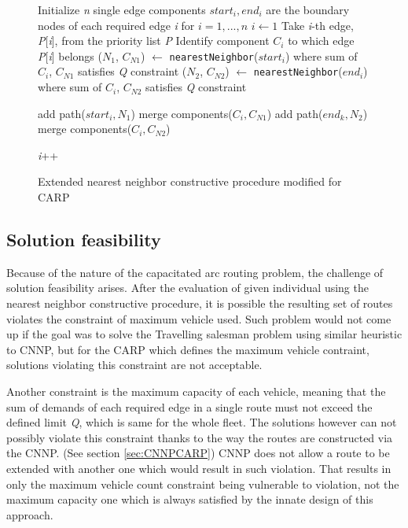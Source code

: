 \documentclass[twoside]{ctuthesis}
\theoremstyle{plain}
\theoremstyle{definition}
\theoremstyle{note}
\begin{document}
	
\begin{figure}
\begin{algorithmic}[1]
	\State Initialize \emph{n} single edge components \emph{$ start_i, end_i $} are the boundary nodes of each required edge \emph{i} for \emph{$ i = 1, ..., n $}
	\State $i \gets 1$
	\State Take \emph{i}-th edge, \emph{P}[\emph{i}], from the priority list \emph{P}
	\State Identify component \emph{$ C_i $} to which edge \emph{P}[\emph{i}] belongs
	\State (\emph{$N_1$}, \emph{$C_{N1}$}) $\gets$  {\tt nearestNeighbor}(\emph{$ start_i $}) where sum of \emph{$ C_i $}, \emph{$C_{N1}$} satisfies \emph{Q} constraint
	\State (\emph{$N_2$}, \emph{$C_{N2}$}) $\gets$  {\tt nearestNeighbor}(\emph{$ end_i $}) where sum of \emph{$ C_i $}, \emph{$C_{N2}$} satisfies \emph{Q} constraint
	
		\State add path(\emph{$ start_i, N_1 $})
		\State merge components(\emph{$C_i, C_{N1}$})
	\Else
		\State add path(\emph{$ end_k, N_2 $})
		\State merge components(\emph{$C_i, C_{N2}$})
	\EndIf
	
	\State \emph{i}++
	\EndWhile
	
	
\end{algorithmic}
	\caption{Extended nearest neighbor constructive procedure modified for CARP}
\label{fig:cnnpcarp}
\end{figure}


 

\subsection{Solution feasibility}
\label{sec:feasibility}
Because of the nature of the capacitated arc routing problem, the challenge of solution feasibility arises. After the evaluation of given individual using the nearest neighbor constructive procedure, it is possible the resulting set of routes violates the constraint of maximum vehicle used. Such problem would not come up if the goal was to solve the Travelling salesman problem using similar heuristic to CNNP, but for the CARP which defines the maximum vehicle contraint, solutions violating this constraint are not acceptable. 

Another constraint is the maximum capacity of each vehicle, meaning that the sum of demands of each required edge in a single route must not exceed the defined limit \emph{Q}, which is same for the whole fleet. The solutions however can not possibly violate this constraint thanks to the way the routes are constructed via the CNNP. (See section \ref{sec:CNNPCARP}) CNNP does not allow a route to be extended with another one which would result in such violation. That results in only the maximum vehicle count constraint being vulnerable to violation, not the maximum capacity one which is always satisfied by the innate design of this approach.
\end{document}
